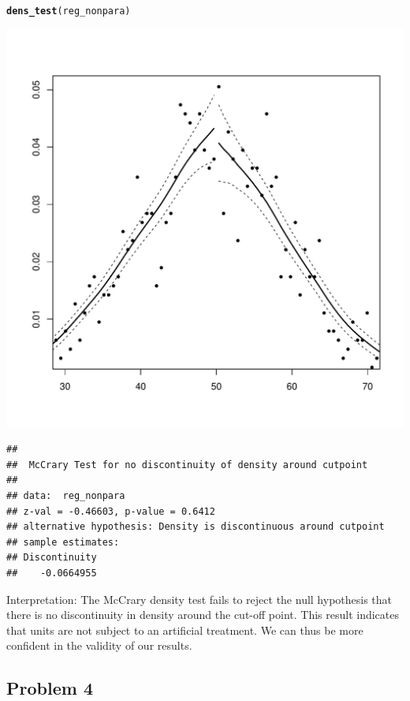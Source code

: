 \documentclass[12pt]{article}\usepackage[]{graphicx}\usepackage[]{color}
\makeatletter
\def\maxwidth{ %
  \ifdim\Gin@nat@width>\linewidth
    \linewidth
  \else
    \Gin@nat@width
  \fi
}
\newcommand{\hlstd}[1]{\textcolor[rgb]{0.345,0.345,0.345}{#1}}%
\newcommand{\hlkwd}[1]{\textcolor[rgb]{0.737,0.353,0.396}{\textbf{#1}}}%
\newenvironment{kframe}{%
 \def\at@end@of@kframe{}%
 \ifinner\ifhmode%
  \def\at@end@of@kframe{\end{minipage}}%
  \begin{minipage}{\columnwidth}%
 \fi\fi%
 \def\FrameCommand##1{\hskip\@totalleftmargin \hskip-\fboxsep
 \colorbox{shadecolor}{##1}\hskip-\fboxsep
     \hskip-\linewidth \hskip-\@totalleftmargin \hskip\columnwidth}%
 \MakeFramed {\advance\hsize-\width
   \@totalleftmargin\z@ \linewidth\hsize
   \@setminipage}}%
 {\par\unskip\endMakeFramed%
 \at@end@of@kframe}
\newenvironment{knitrout}{}{} %
\makeatother
\begin{document}
\begin{knitrout}
\color{fgcolor}\begin{kframe}
\begin{alltt}
\hlkwd{dens_test}\hlstd{(reg_nonpara)}
\end{alltt}
\end{kframe}
\includegraphics[width=\maxwidth]{figure/unnamed-chunk-15-1} 
\begin{kframe}\begin{verbatim}
## 
## 	McCrary Test for no discontinuity of density around cutpoint
## 
## data:  reg_nonpara
## z-val = -0.46603, p-value = 0.6412
## alternative hypothesis: Density is discontinuous around cutpoint
## sample estimates:
## Discontinuity 
##    -0.0664955
\end{verbatim}
\end{kframe}
\end{knitrout}

Interpretation: The McCrary density test fails to reject the null hypothesis that there is no discontinuity in density around the cut-off point. This result indicates that units are not subject to an artificial treatment. We can thus be more confident in the validity of our results.



\subsection*{Problem 4}
\end{document}
